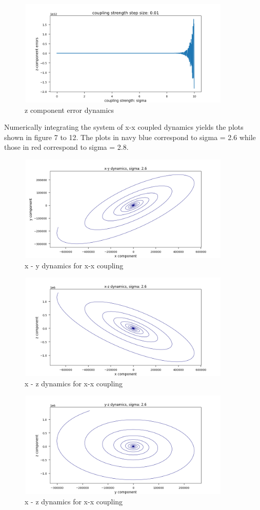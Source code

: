 \documentclass{article}
\begin{document}
\begin{figure}[H]
\centering
\includegraphics[width = 4in, height = 2in]{z_errors_3.png}
\caption{z component error dynamics}
\end{figure}


Numerically integrating the system of x-x coupled dynamics yields the plots shown in figure 7 to 12.
The plots in navy blue correspond to sigma = 2.6 while those in red correspond to sigma = 2.8.

\begin{figure}[H]
\centering
\includegraphics[width = 4in, height = 2in]{x_coupled_s26_xy.png}
\caption{x - y dynamics for x-x coupling}
\end{figure}

\begin{figure}[H]
\centering
\includegraphics[width = 4in, height = 2in]{x_coupled_s26_xz.png}
\caption{x - z dynamics for x-x coupling}
\end{figure}

\begin{figure}[H]
\centering
\includegraphics[width = 4in, height = 2in]{x_coupled_s26_zy.png}
\caption{x - z dynamics for x-x coupling}
\end{figure}
\end{document}
